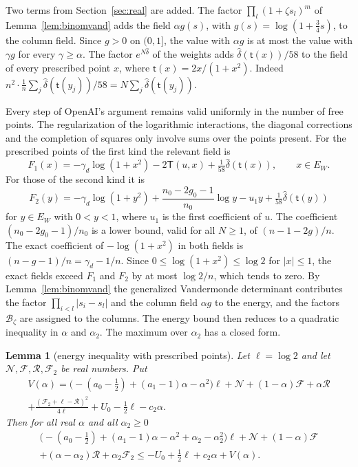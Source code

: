 \documentclass[11pt]{amsart}
\newtheorem{lemma}[theorem]{Lemma}
\theoremstyle{definition}
\theoremstyle{remark}
\numberwithin{equation}{section}
\begin{document}
Two terms from Section~\ref{sec:real} are added. The factor $\prod_l(1+\zeta s_l)^m$ of Lemma~\ref{lem:binomvand}
adds the field $\alpha g(s)$, with $g(s)=\log(1+\frac34s)$, to the column field. Since $g>0$ on $(0,1]$, the
value with $\alpha g$ is at most the value with $\gamma g$ for every $\gamma\ge\alpha$. The factor
$e^{N\hat\delta}$ of the weights adds $\hat\delta(\mathsf t(x))/58$ to the field of every prescribed point $x$,
where $\mathsf t(x)=2x/(1+x^2)$. Indeed $n^2\cdot\frac1n\sum_j\hat\delta(\mathsf t(y_j))/58=N\sum_j\hat\delta(\mathsf t(y_j))$.

Every step of OpenAI's argument remains valid uniformly in the number of free points. The regularization of
the logarithmic interactions, the diagonal corrections and the completion of squares only involve sums over
the points present. For the prescribed points of the first kind the relevant field is
\[
 F_1(x)=-\gamma_d\log(1+x^2)-2\mathsf T(u,x)+\tfrac1{58}\hat\delta(\mathsf t(x)),\qquad x\in E_W .
\]
For those of the second kind it is
\[
 F_2(y)=-\gamma_d\log(1+y^2)+\frac{n_0-2g_0-1}{n_0}\log y-u_1y+\tfrac1{58}\hat\delta(\mathsf t(y))
\]
for $y\in E_W$ with $0<y<1$, where $u_1$ is the first coefficient of $u$. The coefficient $(n_0-2g_0-1)/n_0$ is a lower bound, valid for all
$N\ge1$, of $(n-1-2g)/n$. The exact coefficient of $-\log(1+x^2)$ in both fields is $(n-g-1)/n=\gamma_d-1/n$. Since
$0\le\log(1+x^2)\le\log2$ for $|x|\le1$, the exact fields exceed $F_1$ and $F_2$ by at most $\log2/n$, which tends to zero. By Lemma~\ref{lem:binomvand} the generalized Vandermonde determinant contributes
the factor $\prod_{i<l}|s_i-s_l|$ and the column field $\alpha g$ to the energy, and the factors $\mathcal B_\zeta$
are assigned to the columns. The energy bound then reduces to a quadratic inequality in $\alpha$ and $\alpha_2$.
The maximum over $\alpha_2$ has a closed form.

\begin{lemma}[energy inequality with prescribed points]\label{lem:energy-ineq}
Let $\ell=\log2$ and let $\mathcal N,\mathcal F,\mathcal R,\mathcal F_2$ be real numbers. Put
\begin{multline*}
 V(\alpha)=\bigl(-(a_0-\tfrac12)+(a_1-1)\alpha-\alpha^2\bigr)\ell+\mathcal N+(1-\alpha)\mathcal F+\alpha\mathcal R\\
 +\frac{(\mathcal F_2+\ell-\mathcal R)^2}{4\ell}+U_0-\tfrac12\ell-c_2\alpha .
\end{multline*}
Then for all real $\alpha$ and all $\alpha_2\ge0$
\begin{multline*}
 \bigl(-(a_0-\tfrac12)+(a_1-1)\alpha-\alpha^2+\alpha_2-\alpha_2^2\bigr)\ell+\mathcal N+(1-\alpha)\mathcal F\\
 +(\alpha-\alpha_2)\mathcal R+\alpha_2\mathcal F_2\le-U_0+\tfrac12\ell+c_2\alpha+V(\alpha) .
\end{multline*}
\end{lemma}
\end{document}
